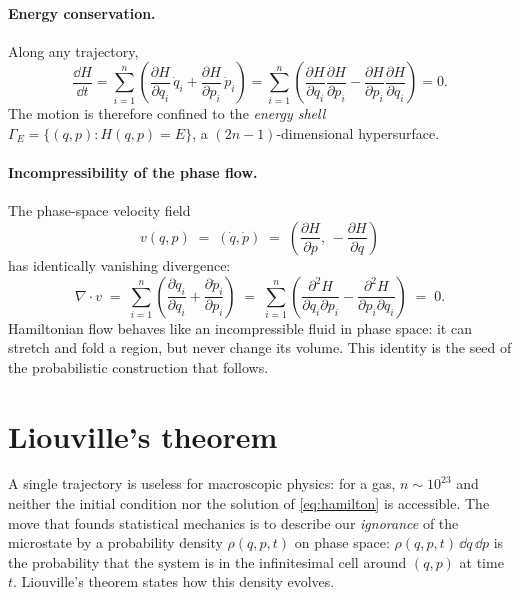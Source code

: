 \paragraph{Energy conservation.} Along any trajectory,
\begin{equation}
  \frac{\dd H}{\dd t}
  = \sum_{i=1}^n \left(
      \frac{\partial H}{\partial q_i}\,\dot q_i
      + \frac{\partial H}{\partial p_i}\,\dot p_i
    \right)
  = \sum_{i=1}^n \left(
      \frac{\partial H}{\partial q_i}\frac{\partial H}{\partial p_i}
      - \frac{\partial H}{\partial p_i}\frac{\partial H}{\partial q_i}
    \right)
  = 0 .
  \label{eq:energy-conservation}
\end{equation}
The motion is therefore confined to the \emph{energy shell}
$\Gamma_E = \{(q,p) : H(q,p) = E\}$, a $(2n-1)$-dimensional hypersurface.

\paragraph{Incompressibility of the phase flow.} The phase-space velocity
field
\begin{equation}
  v(q, p) \;=\; (\dot q, \dot p)
  \;=\; \left( \frac{\partial H}{\partial p},\, -\frac{\partial H}{\partial q} \right)
  \label{eq:phase-velocity}
\end{equation}
has identically vanishing divergence:
\begin{equation}
  \nabla \cdot v
  \;=\; \sum_{i=1}^n \left(
      \frac{\partial \dot q_i}{\partial q_i}
      + \frac{\partial \dot p_i}{\partial p_i}
    \right)
  \;=\; \sum_{i=1}^n \left(
      \frac{\partial^2 H}{\partial q_i \partial p_i}
      - \frac{\partial^2 H}{\partial p_i \partial q_i}
    \right)
  \;=\; 0 .
  \label{eq:incompressible}
\end{equation}
Hamiltonian flow behaves like an incompressible fluid in phase space: it
can stretch and fold a region, but never change its volume. This identity
is the seed of the probabilistic construction that follows.

\section{Liouville's theorem}\label{sec:liouville}

A single trajectory is useless for macroscopic physics: for a gas,
$n \sim 10^{23}$ and neither the initial condition nor the solution of
\eqref{eq:hamilton} is accessible. The move that founds statistical
mechanics is to describe our \emph{ignorance} of the microstate by a
probability density $\rho(q, p, t)$ on phase space:
$\rho(q,p,t)\,\dd q\,\dd p$ is the probability that the system is in the
infinitesimal cell around $(q,p)$ at time $t$. Liouville's theorem states
how this density evolves.


